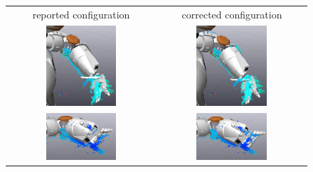 \begin{figure}
\centering
\begin{tabular}{c:c}
reported configuration & corrected configuration \\
\includegraphics[width=0.5\textwidth]{images/offset/visual_verification/rep_5.png} & \includegraphics[width=0.5\textwidth]{images/offset/visual_verification/corr_5.png} \\
\includegraphics[width=0.5\textwidth]{images/offset/visual_verification/rep_100.png} & \includegraphics[width=0.5\textwidth]{images/offset/visual_verification/corr_100.png} \\

\end{tabular}
\end{figure}

